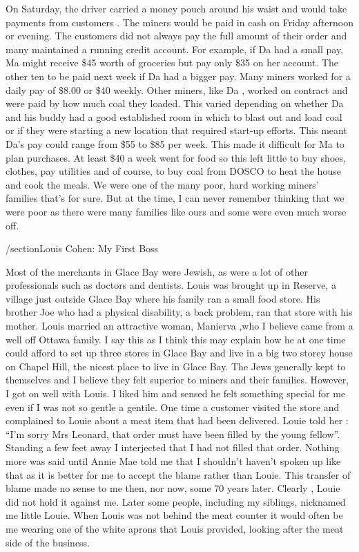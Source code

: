 On Saturday, the driver carried a money pouch around his waist and would take payments from customers . The miners would be paid in cash on Friday afternoon or evening. The customers did not always pay the full amount of their order and many maintained a running credit account. For example, if Da had a small pay, Ma might receive \$45 worth of groceries but pay only \$35 on her account. The other ten to be paid next week if Da had a bigger pay. Many miners worked for a daily pay of \$8.00 or \$40 weekly. Other miners, like Da , worked on contract and were paid by how much coal they loaded. This varied depending on whether Da and his buddy had a good established room in which to blast out and load coal or if they were starting a new location that required start-up efforts. This meant Da's pay could range from \$55 to \$85 per week. This made it difficult for Ma to plan purchases. At least \$40 a week went for food so this left little to buy shoes, clothes, pay utilities and of course, to buy coal from DOSCO to heat the house and cook the meals. We were one of the many poor, hard working miners' families that's for sure. But at the time, I can never remember thinking that we were poor as there were many families like ours and some were even much worse off.

/section{Louis Cohen: My First Boss}

Most of the merchants in Glace Bay were Jewish, as were a lot of other professionals such as doctors and dentists. Louis was brought up in Reserve, a village just outside Glace Bay where his family ran a small food store. His brother Joe who had a physical disability, a back problem, ran that store with his mother. Louis married an attractive woman, Manierva ,who I believe came from a well off Ottawa family. I say this as I think this may explain how he at one time could afford to set up three stores in Glace Bay and live in a big two storey house on Chapel Hill, the nicest place to live in Glace Bay. The Jews generally kept to themselves and I believe they felt superior to miners and their families. However, I got on well with Louis. I liked him and sensed he felt something special for me even if I was not so gentle a gentile. One time a customer visited the store and complained to Louie about a meat item that had been delivered. Louie told her : “I'm sorry Mrs Leonard, that order must have been filled by the young fellow”. Standing a few feet away I interjected that I had not filled that order. Nothing more was said until Annie Mae told me that I shouldn't haven't spoken up like that as it is better for me to accept the blame rather than Louie. This transfer of blame made no sense to me then, nor now, some 70 years later. Clearly , Louie did not hold it against me. Later some people, including my siblings, nicknamed me little Louie. When Louis was not behind the meat counter it would often be me wearing one of the white aprons that Louis provided, looking after the meat side of the business.

